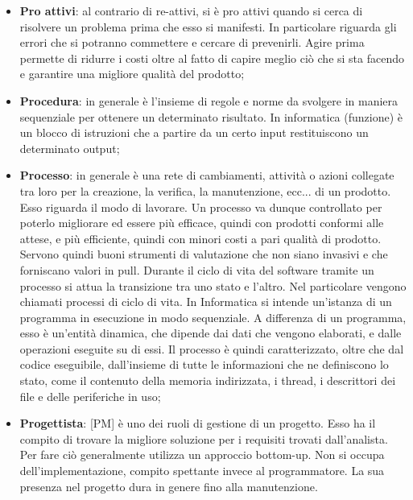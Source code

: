 \begin{itemize}
	\item \textbf{Pro attivi}: al contrario di re-attivi, si è pro attivi quando si cerca di risolvere un problema prima che esso si manifesti. In particolare riguarda gli errori che si potranno commettere e cercare di prevenirli. \newline
Agire prima permette di ridurre i costi oltre al fatto di capire meglio ciò che si sta facendo e garantire una migliore qualità del prodotto;

	\item \textbf{Procedura}: in generale è l'insieme di regole e norme da svolgere in maniera sequenziale per ottenere un determinato risultato. \newline
In informatica (funzione) è un blocco di istruzioni che a partire da un certo input restituiscono un determinato output;

	\item \textbf{Processo}:  in generale è una rete di cambiamenti, attività o azioni collegate tra loro per la creazione, la verifica, la manutenzione, ecc... di un prodotto. Esso riguarda il modo di lavorare. Un processo va dunque controllato per poterlo migliorare ed essere più efficace, quindi con prodotti conformi alle attese, e più efficiente, quindi con minori costi a pari qualità di prodotto. \newline
	Servono quindi buoni strumenti di valutazione che non siano invasivi e che forniscano valori in pull. \newline
	Durante il ciclo di vita del software tramite un processo si attua la transizione tra uno stato e l'altro. Nel particolare vengono chiamati processi di ciclo di vita. \newline
	In Informatica si intende un'istanza di un programma in esecuzione in modo sequenziale. A differenza di un programma, esso è un'entità dinamica, che dipende dai dati che vengono elaborati, e dalle operazioni eseguite su di essi. Il processo è quindi caratterizzato, oltre che dal codice eseguibile, dall'insieme di tutte le informazioni che ne definiscono lo stato, come il contenuto della memoria indirizzata, i thread, i descrittori dei file e delle periferiche in uso;
	
	\item \textbf{Progettista}: [PM] è uno dei ruoli di gestione di un progetto. \newline
	Esso ha il compito di trovare la migliore soluzione per i requisiti trovati dall'analista. Per fare ciò generalmente utilizza un approccio bottom-up. \newline
Non si occupa dell'implementazione, compito spettante invece al programmatore. La sua presenza nel progetto dura in genere fino alla manutenzione.
	

\end{itemize}
